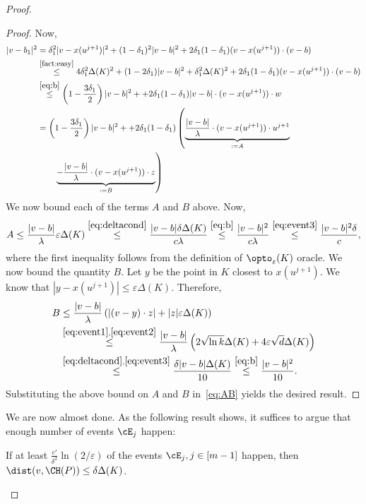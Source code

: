 \begin{proof}
\begin{proof}
 Now, 
 \begin{align}
     \notag
     |v-b_1|^2 & = \delta_1^2 |v-x(u^{j+1})|^2 + (1-\delta_1)^2 |v-b|^2 + 2\delta_1(1-\delta_1) (v-x(u^{j+1}))\cdot (v-b) \\
    \notag & \stackrel{\mbox{\small{\Cref{fact:easy}}}}{\leq} 4 \delta_1^2 \Delta(K)^2 + (1-2\delta_1) |v-b|^2 + \delta_1^2 \Delta(K)^2 + 2\delta_1(1-\delta_1) (v-x(u^{j+1}))\cdot (v-b) \\
    \notag &  \stackrel{\eqref{eq:b}}{\leq} \left( 1 - \frac{3\delta_1}{2} \right) |v-b|^2 +  + 2\delta_1(1-\delta_1) |v-b| \cdot (v-x(u^{j+1}))\cdot w \\
    \notag & = \left( 1 - \frac{3\delta_1}{2} \right) |v-b|^2 +  + 2\delta_1(1-\delta_1) \left( \underbrace{\frac{ |v-b|}{\lambda} \cdot (v-x(u^{j+1}))\cdot u^{j+1}}_{:=A}  \right. \\ \label{eq:AB}
  & \quad \quad  \left. \underbrace{-\frac{ |v-b| }{\lambda}\cdot (v-x(u^{j+1}))\cdot z} _{:=B} \right)
 \end{align}
 We now bound each of the terms $A$ and $B$ above. Now, 
 $$ A \leq \frac{|v-b|}{\lambda} \varepsilon \Delta(K) \stackrel{\eqref{eq:deltacond}}{\leq} \frac{|v-b| \delta \Delta(K)}{c \lambda} \stackrel{\eqref{eq:b}}{\leq} \frac{|v-b|^2}{c \lambda} \stackrel{\eqref{eq:event3}}{\leq} \frac{|v-b|^2 \delta}{c},$$
 where the first inequality follows from the definition of $\opto_\varepsilon(K)$ oracle. We now bound the quantity $B$. Let $y$ be the point in $K$ closest to $x(u^{j+1})$. We know that $|y-x(u^{j+1})| \leq \varepsilon \Delta(K)$. Therefore, 
 \begin{align*}
     B & \leq \frac{|v-b|}{\lambda} \left( |(v-y) \cdot z| + |z| \varepsilon \Delta(K) \right) \\
     & \stackrel{\eqref{eq:event1}, \eqref{eq:event2}}{\leq} \frac{|v-b|}{\lambda} \left( 2 \sqrt{\ln k} \Delta(K) + 4 \varepsilon \sqrt{d} \Delta(K) \right) \\
     & \stackrel{\eqref{eq:deltacond}, \eqref{eq:event3}}{\leq} \frac{\delta |v-b| \Delta(K) }{10} \stackrel{\eqref{eq:b}}{\leq} \frac{|v-b|^2}{10}. 
 \end{align*} 
 Substituting the above bound on $A$ and $B$ in~\eqref{eq:AB} yields the desired result. 
\end{proof}
We are now almost done. As the following result shows, it suffices to argue that enough number of events $\cE_j$ happen:
\begin{claim}
\label{cl:close}
    If at least $\frac{c'}{\delta^2} \ln(2/\varepsilon)$ of the events $\cE_j, j \in [m-1]$ happen, then $\dist(v, \CH(P)) \leq \delta \Delta(K)$. 

\end{claim}
\end{proof}
